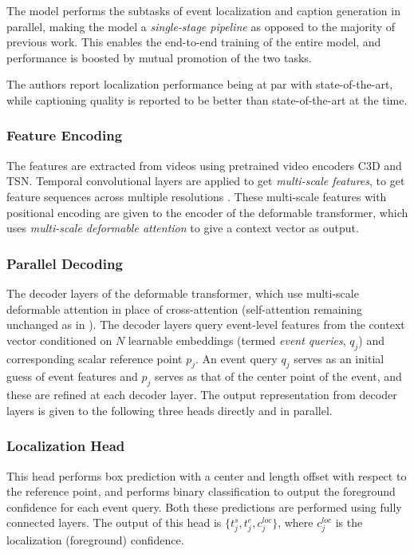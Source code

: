 \par The model performs the subtasks of event localization and caption generation in parallel, making the model a \textit{single-stage pipeline} as opposed to the majority of previous work. This enables the end-to-end training of the entire model, and performance is boosted by mutual promotion of the two tasks.

\par The authors report localization performance being at par with state-of-the-art, while captioning quality is reported to be better than state-of-the-art at the time.


\subsubsection{Feature Encoding}
The features are extracted from videos using pretrained video encoders C3D and TSN. Temporal convolutional layers are applied to get \textit{multi-scale features}, to get feature sequences across multiple resolutions \cite{wang2021endtoend}. These multi-scale features with positional encoding are given to the encoder of the deformable transformer, which uses \textit{multi-scale deformable attention} to give a context vector as output.

\subsubsection{Parallel Decoding}
\par The decoder layers of the deformable transformer, which use multi-scale deformable attention in place of cross-attention (self-attention remaining unchanged as in \cite{tfm}). The decoder layers query event-level features from the context vector conditioned on $N$ learnable embeddings (termed \textit{event queries}, $q_j$) and corresponding scalar reference point $p_j$. An event query $q_j$ serves as an initial guess of event features and $p_j$ serves as that of the center point of the event, and these are refined at each decoder layer. The output representation from decoder layers is given to the following three heads directly and in parallel.

\subsubsection{Localization Head} This head performs box prediction with a center and length offset with respect to the reference point, and performs binary classification to output the foreground confidence for each event query. Both these predictions are performed using fully connected layers. The output of this head is $\{ t_j^s, t_j^e, c_j^{loc} \}$, where $c_j^{loc}$ is the localization (foreground) confidence.

